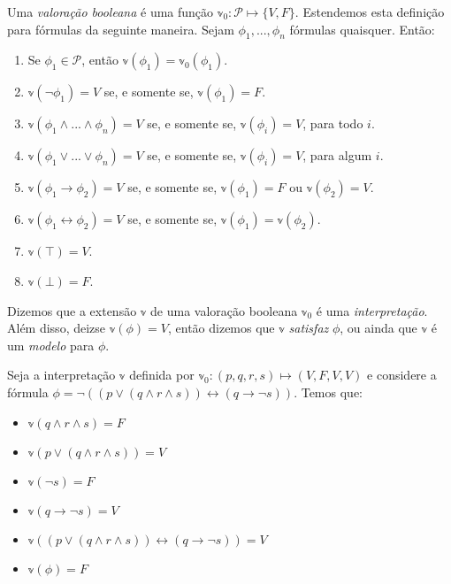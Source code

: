\begin{definition}
    Uma \emph{valoração booleana} é uma função $\mathbb{v}_0 : \mathcal{P} \longmapsto \{V,F\}$. Estendemos esta definição para fórmulas da seguinte maneira. Sejam $\phi_1,...,\phi_n$ fórmulas quaisquer. Então:
    \begin{enumerate}
        \item Se $\phi_1 \in \mathcal{P}$, então $\mathbb{v}(\phi_1) = \mathbb{v}_0(\phi_1)$.
        \item $\mathbb{v}(\neg \phi_1) = V$ se, e somente se, $\mathbb{v}(\phi_1) = F$.
        \item $\mathbb{v}(\phi_1 \wedge ... \wedge \phi_n) = V$ se, e somente se, $\mathbb{v}(\phi_i) = V$, para todo $i$.
        \item $\mathbb{v}(\phi_1 \vee ... \vee \phi_n) = V$ se, e somente se, $\mathbb{v}(\phi_i) = V$, para algum $i$.
        \item $\mathbb{v}(\phi_1 \rightarrow \phi_2) = V$ se, e somente se, $\mathbb{v}(\phi_1) = F$ ou $\mathbb{v}(\phi_2) = V$.
        \item $\mathbb{v}(\phi_1 \leftrightarrow \phi_2) = V$ se, e somente se, $\mathbb{v}(\phi_1) = \mathbb{v}(\phi_2)$.
        \item $\mathbb{v}(\top) = V$.
        \item $\mathbb{v}(\bot) = F$.
    \end{enumerate}
    
    Dizemos que a extensão $\mathbb{v}$ de uma valoração booleana $\mathbb{v}_0$ é uma \emph{interpretação}. Além disso, deizse $\mathbb{v}(\phi) = V$, então dizemos que $\mathbb{v}$ \emph{satisfaz} $\phi$, ou ainda que $\mathbb{v}$ é um \emph{modelo} para $\phi$.
\end{definition}

\begin{example}
    Seja a interpretação $\mathbb{v}$ definida por $\mathbb{v}_0 : (p,q,r,s) \longmapsto (V,F,V,V)$ e considere a fórmula $\phi = \neg((p \vee (q \wedge r \wedge s)) \leftrightarrow (q \rightarrow \neg s))$. Temos que:
    \begin{itemize}
        \item $\mathbb{v}(q \wedge r \wedge s) = F$
        \item $\mathbb{v}(p \vee (q \wedge r \wedge s)) = V$
        \item $\mathbb{v}(\neg s) = F$
        \item $\mathbb{v}(q \rightarrow \neg s) = V$
        \item $\mathbb{v}((p \vee (q \wedge r \wedge s)) \leftrightarrow (q \rightarrow \neg s)) = V$
        \item $\mathbb{v}(\phi) = F$
    \end{itemize}
\end{example}

